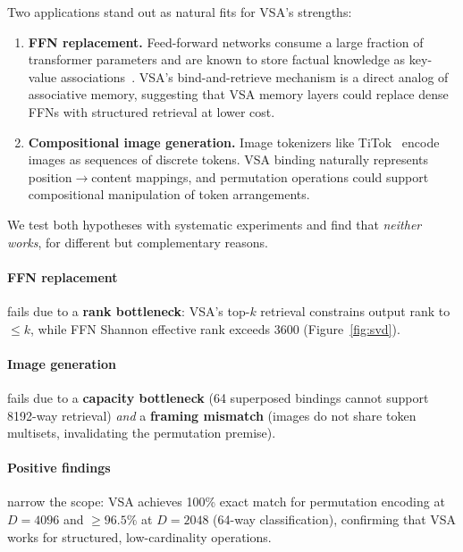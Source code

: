 \documentclass{article}
\begin{document}
Two applications stand out as natural fits for VSA's strengths:

\begin{enumerate}[leftmargin=*]
\item \textbf{FFN replacement.} Feed-forward networks consume a large fraction of transformer parameters and are known to store factual knowledge as key-value associations~\citep{sukhbaatar2019augmenting}.
VSA's bind-and-retrieve mechanism is a direct analog of associative memory, suggesting that VSA memory layers could replace dense FFNs with structured retrieval at lower cost.
\item \textbf{Compositional image generation.} Image tokenizers like TiTok~\citep{yu2024image} encode images as sequences of discrete tokens.
VSA binding naturally represents position$\to$content mappings, and permutation operations could support compositional manipulation of token arrangements.
\end{enumerate}

We test both hypotheses with systematic experiments and find that \emph{neither works}, for different but complementary reasons.

\paragraph{FFN replacement} fails due to a \textbf{rank bottleneck}: VSA's top-$k$ retrieval constrains output rank to ${\le}k$, while FFN Shannon effective rank exceeds 3600 (Figure~\ref{fig:svd}).

\paragraph{Image generation} fails due to a \textbf{capacity bottleneck} (64 superposed bindings cannot support 8192-way retrieval) \emph{and} a \textbf{framing mismatch} (images do not share token multisets, invalidating the permutation premise).

\paragraph{Positive findings} narrow the scope: VSA achieves 100\% exact match for permutation encoding at $D{=}4096$ and ${\ge}96.5\%$ at $D{=}2048$ (64-way classification), confirming that VSA works for structured, low-cardinality operations.
\end{document}
